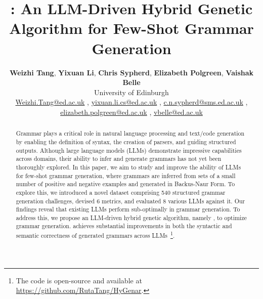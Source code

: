 \documentclass[11pt]{article}
\title{\NAME: An LLM-Driven Hybrid Genetic Algorithm for Few-Shot Grammar Generation}
\author{
 \textbf{Weizhi Tang},
 \textbf{Yixuan Li},
 \textbf{Chris Sypherd},
 \textbf{Elizabeth Polgreen},
 \textbf{Vaishak Belle}
\\
 University of Edinburgh
\\
 \small{
   \href{mailto:email@domain}{Weizhi.Tang@ed.ac.uk}
 },
 \small{
   \href{mailto:email@domain}{yixuan.li.cs@ed.ac.uk}
 },
 \small{
   \href{mailto:email@domain}{c.n.sypherd@sms.ed.ac.uk}
 },\\
 \small{
   \href{mailto:email@domain}{elizabeth.polgreen@ed.ac.uk}
 },
 \small{
   \href{mailto:email@domain}{vbelle@ed.ac.uk}
 }
}
\begin{document}
\maketitle
\begin{abstract}
Grammar plays a critical role in natural language processing and text/code generation by enabling the definition of syntax, the creation of parsers, and guiding structured outputs. Although large language models (LLMs) demonstrate impressive capabilities across domains, their ability to infer and generate grammars has not yet been thoroughly explored. In this paper, we aim to study and improve the ability of LLMs for few-shot grammar generation, where grammars are inferred from sets of a small number of positive and negative examples and generated in Backus-Naur Form. To explore this, we introduced a novel dataset comprising 540 structured grammar generation challenges, devised 6 metrics, and evaluated 8 various LLMs against it. Our findings reveal that existing LLMs perform sub-optimally in grammar generation. To address this, we propose an LLM-driven hybrid genetic algorithm, namely \NAME, to optimize grammar generation. \NAME achieves substantial improvements in both the syntactic and semantic correctness of generated grammars across LLMs~\footnote{The code is open-source and available at \url{https://github.com/RutaTang/HyGenar}.}.
\end{abstract}



% 















% 

\clearpage
\appendix


\end{document}

